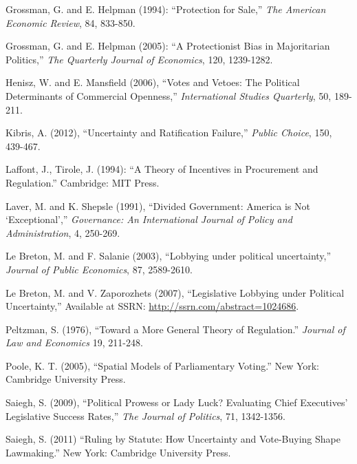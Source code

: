 \documentclass[12pt]{article}
\begin{document}
\begin{list}{}{\setlength{\leftmargin}{0.3in}\setlength{\rightmargin}{0.0in}\setlength{\itemindent}{-0.3in}\setlength{\itemsep}{0.0in}}
\item Grossman, G. and E. Helpman (1994): ``Protection for Sale,'' {\em The American Economic Review}, 84, 833-850.

\item Grossman, G. and E. Helpman (2005): ``A Protectionist Bias in Majoritarian Politics,'' {\em The Quarterly Journal of Economics}, 120, 1239-1282.

\item Henisz, W. and E. Mansfield (2006), ``Votes and Vetoes: The Political Determinants of Commercial Openness,'' {\em International Studies Quarterly}, 50, 189-211.

\item Kibris, A. (2012), ``Uncertainty and Ratification Failure,'' {\em Public Choice}, 150, 439-467.

\item Laffont, J., Tirole, J. (1994): ``A Theory of Incentives in Procurement and Regulation.'' Cambridge: MIT Press.

\item Laver, M. and K. Shepsle (1991), ``Divided Government: America is Not `Exceptional','' {\em Governance: An International Journal of Policy and Administration}, 4, 250-269.

\item Le Breton, M. and F. Salanie (2003), ``Lobbying under political uncertainty,'' {\em Journal of Public Economics}, 87, 2589-2610.

\item Le Breton, M. and V. Zaporozhets (2007), ``Legislative Lobbying under Political Uncertainty,'' Available at SSRN: \url{http://ssrn.com/abstract=1024686}.

\item Peltzman, S. (1976), ``Toward a More General Theory of Regulation.'' {\em Journal of Law and Economics} 19, 211-248.

\item Poole, K. T. (2005), ``Spatial Models of Parliamentary Voting.'' New York: Cambridge University Press.

\item Saiegh, S. (2009), ``Political  Prowess or Lady Luck? Evaluating Chief Executives' Legislative Success Rates,'' {\em The Journal of Politics}, 71, 1342-1356.

\item Saiegh, S. (2011) ``Ruling by Statute: How Uncertainty and Vote-Buying Shape Lawmaking.'' New York: Cambridge University Press.


\end{list}
\end{document}
